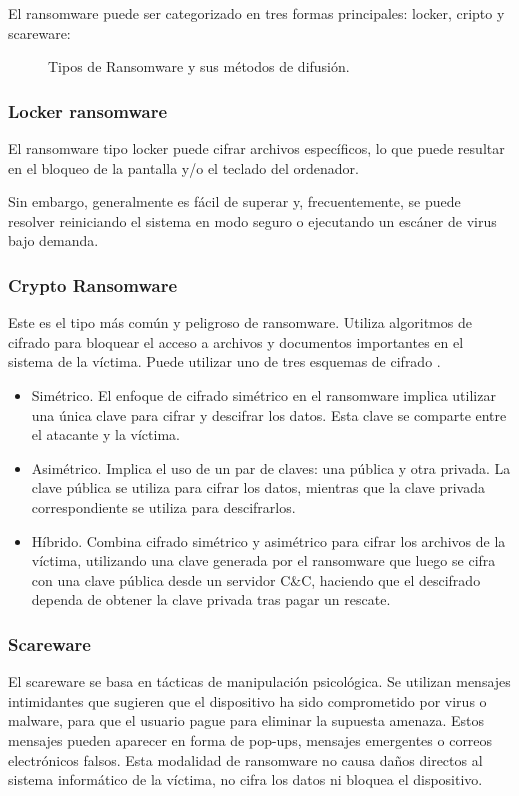El ransomware puede ser categorizado en tres formas principales: locker, cripto y scareware\autocite{beaman2021ransomware}:

\begin{figure}[H]
\centering

\caption{Tipos de Ransomware y sus métodos de difusión.}
\end{figure}

\subsubsection{Locker ransomware}
El ransomware tipo locker puede cifrar archivos específicos, lo que puede resultar en el bloqueo de la pantalla y/o el teclado del ordenador.

Sin embargo, generalmente es fácil de superar y, frecuentemente, se puede resolver reiniciando el sistema en modo seguro o ejecutando un escáner de virus bajo demanda.

\subsubsection{Crypto Ransomware}
Este es el tipo más común y peligroso de ransomware. Utiliza algoritmos de cifrado para bloquear el acceso a archivos y documentos importantes en el sistema de la víctima. Puede utilizar uno de tres esquemas de cifrado .
\begin{itemize}
    \item Simétrico. El enfoque de cifrado simétrico en el ransomware implica utilizar una única clave para cifrar y descifrar los datos. Esta clave se comparte entre el atacante y la víctima.
    \item Asimétrico. Implica el uso de un par de claves: una pública y otra privada. La clave pública se utiliza para cifrar los datos, mientras que la clave privada correspondiente se utiliza para descifrarlos.
    \item Híbrido. Combina cifrado simétrico y asimétrico para cifrar los archivos de la víctima, utilizando una clave generada por el ransomware que luego se cifra con una clave pública desde un servidor C\&C, haciendo que el descifrado dependa de obtener la clave privada tras pagar un rescate.
\end{itemize}

\subsubsection{Scareware}
El scareware se basa en tácticas de manipulación psicológica. Se utilizan mensajes intimidantes que sugieren que el dispositivo ha sido comprometido por virus o malware, para que el usuario pague para eliminar la supuesta amenaza. Estos mensajes pueden aparecer en forma de pop-ups, mensajes emergentes o correos electrónicos falsos. Esta modalidad de ransomware no causa daños directos al sistema informático de la víctima, no cifra los datos ni bloquea el dispositivo. 